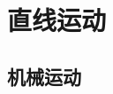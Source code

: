 \documentclass[color=purple,openany]{textbook-cn}
\begin{document}
\chaptersaying{\lipsum[1][3]}
\chapter{直线运动}
\begin{Block*}[章节引入]
\lipsum[1-9]
\end{Block*}
\lipsum[1]

\section{机械运动}


\begin{multicols}{2}

\begin{QsNum}
\item \lipsum[1][1]
\item \lipsum[1][1]
\item \lipsum[1][1]
\item \lipsum[1][1]
\item \lipsum[1][1]
\item \lipsum[1][1]
\item \lipsum[1][1]
\item \lipsum[1][1]
\item \lipsum[1][1]
\item \lipsum[1][1]
\item \lipsum[1][1]
\item \lipsum[1][1]
\end{QsNum}

\end{multicols}


\begin{multicols}{2}

\begin{QsNum}
\item \lipsum[1][1]
\item \lipsum[1][1]
\item \lipsum[1][1]
\item \lipsum[1][1]
\item \lipsum[1][1]
\item \lipsum[1][1]
\item \lipsum[1][1]
\item \lipsum[1][1]
\item \lipsum[1][1]
\item \lipsum[1][1]
\item \lipsum[1][1]
\item \lipsum[1][1]
\end{QsNum}

\end{multicols}
\end{document}
